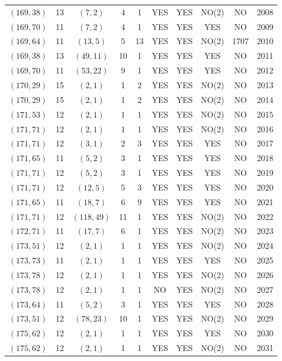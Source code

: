 \begin{longtable}{|c|c|c|c|c|c|c|c|c|c|}
$(169, 38)$ & 13 & $(7, 2)$ & 4 & 1 & YES & YES & NO(2) & NO & 2008\\
$(169, 70)$ & 11 & $(7, 2)$ & 4 & 1 & YES & YES & YES & NO & 2009\\
$(169, 64)$ & 11 & $(13, 5)$ & 5 & 13 & YES & YES & NO(2) & 1707 & 2010\\
$(169, 38)$ & 13 & $(49, 11)$ & 10 & 1 & YES & YES & YES & NO & 2011\\
$(169, 70)$ & 11 & $(53, 22)$ & 9 & 1 & YES & YES & YES & NO & 2012\\
$(170, 29)$ & 15 & $(2, 1)$ & 1 & 2 & YES & YES & NO(2) & NO & 2013\\
$(170, 29)$ & 15 & $(2, 1)$ & 1 & 2 & YES & YES & NO(2) & NO & 2014\\
$(171, 53)$ & 12 & $(2, 1)$ & 1 & 1 & YES & YES & NO(2) & NO & 2015\\
$(171, 71)$ & 12 & $(2, 1)$ & 1 & 1 & YES & YES & NO(2) & NO & 2016\\
$(171, 71)$ & 12 & $(3, 1)$ & 2 & 3 & YES & YES & YES & NO & 2017\\
$(171, 65)$ & 11 & $(5, 2)$ & 3 & 1 & YES & YES & YES & NO & 2018\\
$(171, 71)$ & 12 & $(5, 2)$ & 3 & 1 & YES & YES & YES & NO & 2019\\
$(171, 71)$ & 12 & $(12, 5)$ & 5 & 3 & YES & YES & YES & NO & 2020\\
$(171, 65)$ & 11 & $(18, 7)$ & 6 & 9 & YES & YES & YES & NO & 2021\\
$(171, 71)$ & 12 & $(118, 49)$ & 11 & 1 & YES & YES & NO(2) & NO & 2022\\
$(172, 71)$ & 11 & $(17, 7)$ & 6 & 1 & YES & YES & NO(2) & NO & 2023\\
$(173, 51)$ & 12 & $(2, 1)$ & 1 & 1 & YES & YES & NO(2) & NO & 2024\\
$(173, 73)$ & 11 & $(2, 1)$ & 1 & 1 & YES & YES & YES & NO & 2025\\
$(173, 78)$ & 12 & $(2, 1)$ & 1 & 1 & YES & YES & NO(2) & NO & 2026\\
$(173, 78)$ & 12 & $(2, 1)$ & 1 & 1 & NO & YES & NO(2) & NO & 2027\\
$(173, 64)$ & 11 & $(5, 2)$ & 3 & 1 & YES & YES & YES & NO & 2028\\
$(173, 51)$ & 12 & $(78, 23)$ & 10 & 1 & YES & YES & NO(2) & NO & 2029\\
$(175, 62)$ & 12 & $(2, 1)$ & 1 & 1 & YES & YES & YES & NO & 2030\\
$(175, 62)$ & 12 & $(2, 1)$ & 1 & 1 & YES & YES & NO(2) & NO & 2031\\

\end{longtable}
